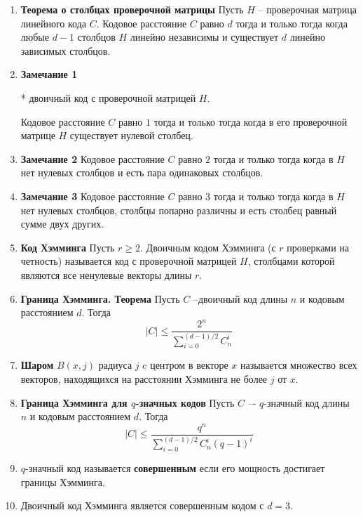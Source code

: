 \documentclass[a4paper, 12pt]{report}
\begin{document}
\begin{enumerate}


\item \textbf{Теорема о столбцах проверочной матрицы}
Пусть $H$ – проверочная матрица линейного кода $C$. Кодовое
расстояние $C$ равно $d$ тогда и только тогда когда любые $d - 1$
столбцов $H$ линейно независимы и существует $d$ линейно
зависимых столбцов.


\item \textbf{Замечание 1}

* двоичный код с проверочной матрицей $H$.

Кодовое расстояние $C$ равно $1$ тогда и только тогда когда в
его проверочной матрице $H$ существует нулевой столбец.

\item \textbf{Замечание 2}
Кодовое расстояние $C$ равно $2$ тогда и только тогда когда в
$H$ нет нулевых столбцов и есть пара одинаковых столбцов.

\item \textbf{Замечание 3}
Кодовое расстояние $C$ равно $3$ тогда и только тогда когда в
$H$ нет нулевых столбцов, столбцы попарно различны и есть
столбец равный сумме двух других.

\item \textbf{Код Хэмминга}
Пусть $r \geq 2$. Двоичным кодом Хэмминга (с $r$ проверками на
четность) называется код с проверочной матрицей $H$,
столбцами которой являются все ненулевые векторы длины $r$.

\item \textbf{Граница Хэмминга. Теорема}
Пусть $C$ –двоичный код длины $n$ и кодовым расстоянием $d$.
Тогда
\[  |C| \leq \frac {2^n} {{\sum_{i = 0}^{(d - 1)/2} C_n^i}} \]


\item \textbf{Шаром }  $B(x, j)$ радиуса $j$ c центром в векторе $x$ называется
множество всех векторов, находящихся на расстоянии
Хэмминга не более $j$ от $x$.

\item \textbf{Граница Хэмминга для $q$-значных кодов}
Пусть $C$ –- $q$-значный код длины $n$ и кодовым расстоянием $d$.
Тогда
\[  |C| \leq \frac {q^n} {{\sum_{i = 0}^{(d - 1)/2} C_n^i (q - 1)^i}} \]

\item
$q$-значный код называется \textbf{совершенным} если его мощность
достигает границы Хэмминга.

\item 
Двоичный код Хэмминга является совершенным кодом с $d = 3$.


\end{enumerate}
\end{document}
